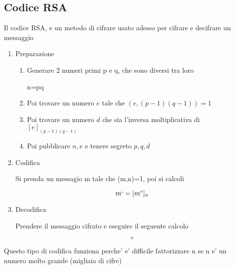 \documentclass{article}
\begin{document}
  \subsection{Codice RSA}
  \begin{flushleft}
    Il codice RSA, e un metodo di cifrare usato adesso per cifrare e decifrare un messaggio
  \end{flushleft}
  \begin{enumerate}
    \item Preparazione
      \begin{enumerate}
        \item Generare 2 numeri primi p e q, che sono diversi tra loro
          \begin{flushleft}
            n=pq
          \end{flushleft}
        \item Poi trovare un numero $e$ tale che $(e,(p-1)(q-1))=1$
        \item Poi trovare un numero $d$ che sia l'inversa moltiplicativa di $[e]_{(p-1)(q-1)}$
        \item Poi pubblicare $n,e$ e tenere segreto $p,q,d$
      \end{enumerate}
    \item Codifica
      \begin{flushleft}
        Si prenda un messagio m tale che (m,n)=1, poi si calcoli
      \end{flushleft}
      \begin{equation*}
        m`=[m^e]_n
      \end{equation*}
    \item Decodifica
      \begin{flushleft}
        Prendere il messaggio cifrato e eseguire il seguente calcolo
      \end{flushleft}
      \begin{equation*}
        [m`^d]_n
      \end{equation*}
  \end{enumerate}
  \begin{flushleft}
    Questo tipo di codifica funziona perche' e' difficile fattorizzare n se n e' un numero
    molto grande (migliaia di cifre)
  \end{flushleft}
\end{document}
